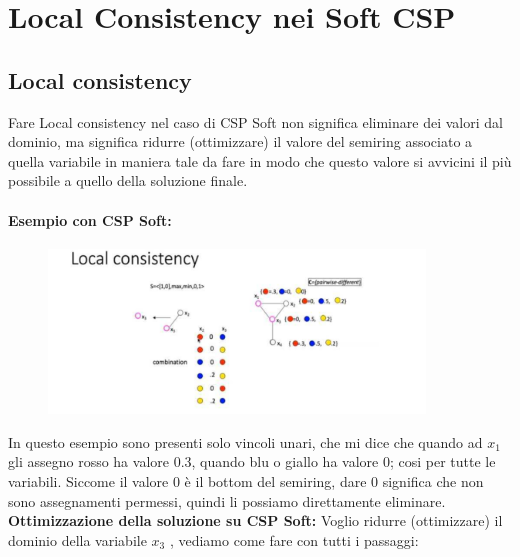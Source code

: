 \chapter{Local Consistency nei Soft CSP} \label{ch:Local Consistency nei Soft CSP}
\section{Local consistency}
Fare Local consistency nel caso di CSP Soft non significa eliminare dei valori dal dominio, ma significa ridurre (ottimizzare) il valore del semiring associato a quella variabile in maniera tale da fare in modo che questo valore si avvicini il più possibile a quello della soluzione finale.
\subsubsection{Esempio con CSP Soft:}
\begin{figure}[htp]
	\centering
    \includegraphics[width=10cm, keepaspectratio]{img/Cap5/LocalConsistency.png}
\end{figure}
In questo esempio sono presenti solo vincoli unari, che mi dice che quando ad $x_1$ gli assegno rosso ha valore 0.3, quando blu o giallo ha valore 0; cosi per tutte le variabili. Siccome il valore 0 è il bottom del semiring, dare 0 significa che non sono assegnamenti permessi, quindi li possiamo direttamente
eliminare.
\\
\textbf{Ottimizzazione della soluzione su CSP Soft: } Voglio ridurre (ottimizzare) il dominio della variabile $x_3$ , vediamo come fare con tutti i passaggi:
